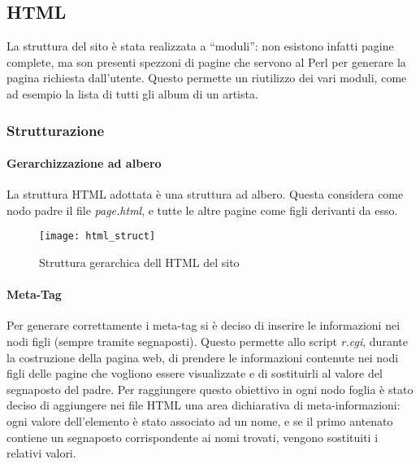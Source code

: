 \graphicspath{ {res/img/} }

\subsection{HTML}
La struttura del sito \`e stata realizzata a ``moduli'': non esistono infatti pagine complete, ma son presenti spezzoni di pagine che servono al Perl per generare la pagina richiesta dall'utente. Questo permette un riutilizzo dei vari moduli, come ad esempio la lista di tutti gli album di un artista.
\subsubsection{Strutturazione}

\paragraph*{Gerarchizzazione ad albero}La struttura HTML adottata \`e una struttura ad albero. Questa considera come nodo padre il file \textit{page.html}, e tutte le altre pagine come figli derivanti da esso.


\begin{landscape}

  \thispagestyle{empty}

  \begin{figure}[H]
    \centering
    \texttt{[image: html\_struct]}
    \caption{Struttura gerarchica dell HTML del sito}
  \end{figure}

\end{landscape}

\restoregeometry

\paragraph*{Meta-Tag}Per generare correttamente i meta-tag si \`e deciso di inserire le informazioni nei nodi figli (sempre tramite segnaposti). Questo permette allo script \textit{r.cgi}, durante la costruzione della pagina web, di prendere le informazioni contenute nei nodi figli delle pagine che vogliono essere visualizzate e di sostituirli al valore del segnaposto del padre. Per raggiungere questo obiettivo in ogni nodo foglia \`e stato deciso di aggiungere nei file HTML una area dichiarativa di meta-informazioni: ogni valore dell'elemento \`e stato associato ad un nome, e se il primo antenato contiene un segnaposto corrispondente ai nomi trovati, vengono sostituiti i relativi valori.

